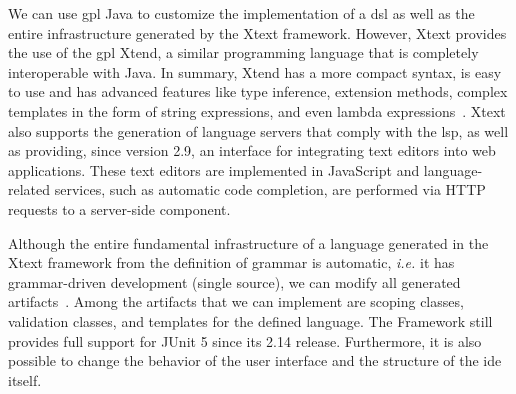 We can use \ac{gpl} Java to customize the implementation of a \ac{dsl} as well as the entire infrastructure generated by the Xtext framework.
However, Xtext provides the use of the \ac{gpl} Xtend, a similar programming language that is completely interoperable with Java. 
In summary, Xtend has a more compact syntax, is easy to use and has advanced features like type inference, extension methods, complex templates in the form of string expressions, and even lambda expressions~\cite{Bettini:2016}.
Xtext also supports the generation of language servers that comply with the \ac{lsp}, as well as providing, since version 2.9, an interface for integrating text editors into web applications.
These text editors are implemented in JavaScript and language-related services, such as automatic code completion, are performed via HTTP requests to a server-side component.

Although the entire fundamental infrastructure of a language generated in the Xtext framework from the definition of grammar is automatic, \textit{i.e.} it has grammar-driven development (single source), we can modify all generated artifacts~\cite{XtextSirius:2017}.
Among the artifacts that we can implement are scoping classes, validation classes, and templates for the defined language.
The Framework still provides full support for JUnit 5 since its 2.14 release.
Furthermore, it is also possible to change the behavior of the user interface and the structure of the \ac{ide} itself.


